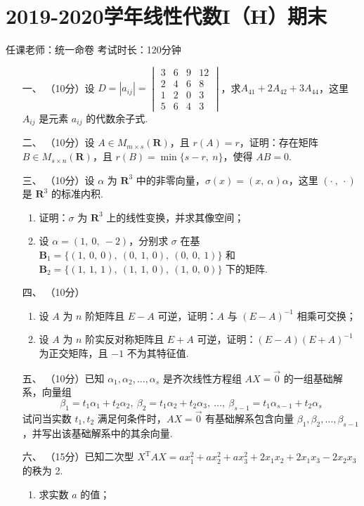 \section*{2019-2020学年线性代数I（H）期末}

\begin{center}
    任课老师：统一命卷\hspace{4em} 考试时长：120分钟
\end{center}

\begin{enumerate}
	\item[一、]（10分）设 $D=|a_{ij}|=\begin{vmatrix}3 & 6 & 9 & 12 \\ 2 & 4 & 6 & 8 \\1 & 2 & 0 & 3 \\ 5 & 6 & 4 & 3\end{vmatrix}$，求$A_{41}+2A_{42}+3A_{44}$，这里 $A_{ij}$ 是元素 $a_{ij}$ 的代数余子式.
	\item[二、]（10分）设 $A \in M_{m \times s}(\mathbf{R})$，且 $r(A)=r$，证明：存在矩阵 $B \in M_{s \times n}(\mathbf{R})$，且 $r(B)=\min\{s-r,\ n\}$，使得 $AB=0$.
	\item[三、]（10分）设 $\alpha$ 为 $\mathbf{R}^3$ 中的非零向量，$\sigma(x)=(x,\ \alpha)\alpha$，这里 $(\cdot\ ,\ \cdot)$ 是 $\mathbf{R}^3$ 的标准内积.
    \begin{enumerate}[label=(\arabic*)]
        \item 证明：$\sigma$ 为 $\mathbf{R}^3$ 上的线性变换，并求其像空间；

        \item 设 $\alpha=(1,\ 0,\ -2)$，分别求 $\sigma$ 在基 $\mathbf{B}_1=\{(1,\ 0,\ 0),\ (0,\ 1,\ 0),\ (0,\ 0,\ 1)\}$ 和 $\mathbf{B}_2=\{(1,\ 1,\ 1),\ (1,\ 1,\ 0),\ (1,\ 0,\ 0)\}$ 下的矩阵.
    \end{enumerate}
	\item[四、]（10分）
    \begin{enumerate}[label=(\arabic*)]
        \item 设 $A$ 为 $n$ 阶矩阵且 $E-A$ 可逆，证明：$A$ 与 $(E-A)^{-1}$ 相乘可交换；

        \item 设 $A$ 为 $n$ 阶实反对称矩阵且 $E+A$ 可逆，证明：$(E-A)(E+A)^{-1}$ 为正交矩阵，且 $-1$ 不为其特征值.
    \end{enumerate}
	\item[五、]（10分）已知 $\alpha_1,\alpha_2,\ldots,\alpha_s$ 是齐次线性方程组 $AX=\vec{0}$ 的一组基础解系，向量组
    \[\beta_1=t_1\alpha_1+t_2\alpha_2,\ \beta_2=t_1\alpha_2+t_2\alpha_3,\ \ldots,\ \beta_{s-1}=t_1\alpha_{s-1}+t_2\alpha_s\]
    试问当实数 $t_1,t_2$ 满足何条件时，$AX=\vec{0}$ 有基础解系包含向量 $\beta_1,\beta_2,\ldots,\beta_{s-1}$，并写出该基础解系中的其余向量.
	\item[六、]（15分）已知二次型 $X^{\mathrm{T}}AX=ax_1^2+ax_2^2+ax_3^2+2x_1x_2+2x_1x_3-2x_2x_3$ 的秩为 2.
    \begin{enumerate}[label=(\arabic*)]
        \item 求实数 $a$ 的值；


\end{enumerate}
\end{enumerate}
